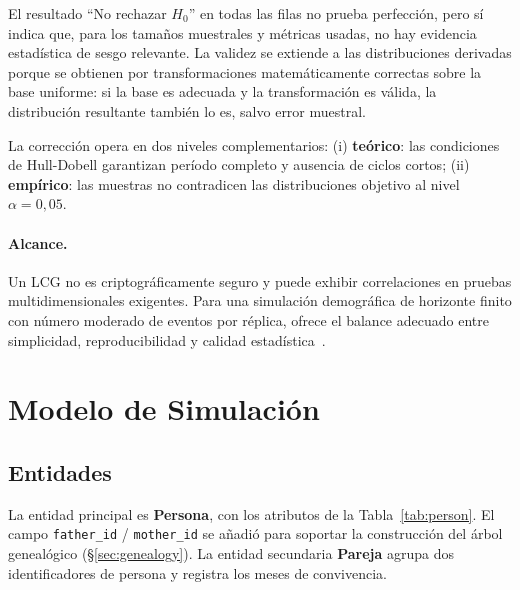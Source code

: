 \documentclass{llncs}
\begin{document}
El resultado ``No rechazar $H_0$'' en todas las filas no prueba perfección,
pero sí indica que, para los tamaños muestrales y métricas usadas, no hay
evidencia estadística de sesgo relevante.
La validez se extiende a las distribuciones derivadas porque se obtienen
por transformaciones matemáticamente correctas sobre la base uniforme:
si la base es adecuada y la transformación es válida, la distribución
resultante también lo es, salvo error muestral.

La corrección opera en dos niveles complementarios:
(i) \textbf{teórico}: las condiciones de Hull-Dobell garantizan período
    completo y ausencia de ciclos cortos;
(ii) \textbf{empírico}: las muestras no contradicen las distribuciones
     objetivo al nivel $\alpha = 0{,}05$.

\paragraph{Alcance.}
Un LCG no es criptográficamente seguro y puede exhibir correlaciones en
pruebas multidimensionales exigentes.
Para una simulación demográfica de horizonte finito con número moderado de
eventos por réplica, ofrece el balance adecuado entre simplicidad,
reproducibilidad y calidad estadística~\cite{law2015}.

\section{Modelo de Simulación}
\label{sec:modelo}

\subsection{Entidades}

La entidad principal es \textbf{Persona}, con los atributos de la
Tabla~\ref{tab:person}.
El campo \texttt{father\_id} / \texttt{mother\_id} se añadió para soportar
la construcción del árbol genealógico (\S\ref{sec:genealogy}).
La entidad secundaria \textbf{Pareja} agrupa dos identificadores de persona
y registra los meses de convivencia.
\end{document}
